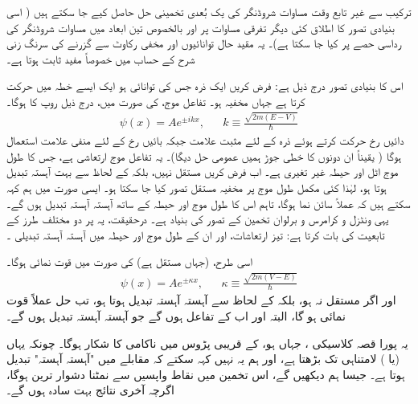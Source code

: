   ترکیب سے غیر تابع وقت مساوات شروڈنگر کی یک بُعدی تخمینی حل حاصل کیے جا سکتے ہیں ( اسی بنیادی تصور کا اطلاق کئی دیگر تفرقی مساوات پر اور بالخصوص تین ابعاد میں مساوات شروڈنگر کی رداسی حصے پر کیا جا سکتا ہے)۔ یہ  مقید حال توانائیوں اور مخفی رکاوٹ سے گزرنے کی سرنگ زنی شرح کے حساب میں خصوصاً  مفید ثابت ہوتا ہے۔

اس کا بنیادی تصور درج ذیل ہے: فرض کریں ایک ذرہ جس کی توانائی  ہو ایک ایسے خطہ میں حرکت کرتا ہے جہاں مخفیہ    ہو۔ تفاعل موج،   کی صورت میں،  درج ذیل روپ کا  ہوگا۔
\begin{align*}
	\psi(x)=Ae^{\pm ikx}, && k\equiv\frac{\sqrt{2m(E-V)}}{\hslash} 
\end{align*}
دائیں رخ حرکت کرتے ہوئے ذرہ  کے لئے مثبت علامت جبکہ بائیں رخ کے لئے منفی علامت استعمال ہوگا ( یقیناً ان دونوں کا خطی جوڑ ہمیں  عمومی حل دیگا)۔ یہ تفاعل موج ارتعاشی ہے،  جس کا طول موج  اٹل  اور  حیطہ  غیر تغیری  ہے۔ اب فرض کریں   مستقل نہیں،   بلکہ  کے لحاظ سے بہت آہستہ تبدیل ہوتا ہو،  لہٰذا  کئی  مکمل  طول موج پر مخفیہ  مستقل تصور کیا جا سکتا ہو۔ ایسی صورت میں ہم کہہ سکتے ہیں کہ  عملاً سائن نما ہوگا،  تاہم اس کا طول موج اور حیطہ  کے ساتھ  آہستہ آہستہ تبدیل ہوں گے۔ یہی  ونٹزل  و کرامرس  و برلوان تخمین   کے تصور  کی بنیاد ہے۔ درحقیقت،  یہ  پر دو مختلف طرز کے تابعیت کی بات کرتا ہے: تیز    ارتعاشات،    اور ان کے   طول موج اور حیطہ میں   آہستہ آہستہ   تبدیلی   ۔

اسی طرح،    (جہاں  مستقل ہے)  کی صورت میں  قوت نمائی ہوگا۔
\begin{align*}
	\psi(x)=Ae^{\pm\kappa x},&& \kappa \equiv\frac{\sqrt{2m(V-E)}}{\hslash} 
\end{align*}
اور اگر   مستقل نہ ہو،  بلکہ  کے لحاظ سے آہستہ آہستہ تبدیل ہوتا ہو، تب حل عملاً قوت نمائی ہو گا،  البتہ  اور  اب  کے تفاعل ہوں گے جو  آہستہ آہستہ تبدیل   ہوں گے۔ 

یہ  پورا قصہ  کلاسیکی ، جہاں  ہو،  کے   قریبی پڑوس میں ناکامی کا شکار ہوگا۔  چونکہ  یہاں  (یا )  لامتناہی تک بڑھتا ہے،  اور ہم یہ نہیں کہہ سکتے  کہ  مقابلے   میں "آہستہ آہستہ"  تبدیل ہوتا ہے۔ جیسا ہم  دیکھیں گے،  اس تخمین میں نقاط واپسیں  سے نمٹنا دشوار ترین  ہوگا،  اگرچہ آخری نتائج  بہت سادہ ہوں گے۔

